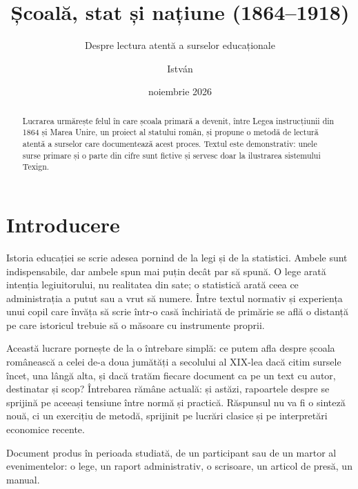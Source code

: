 \documentclass{texign-article}
\title{Școală, stat și națiune (1864–1918)}
\subtitle{Despre lectura atentă a surselor educaționale}
\author{István}
\date{noiembrie 2026}
\begin{document}
\maketitle

\begin{abstract}
Lucrarea urmărește felul în care școala primară a devenit, între Legea instrucțiunii din 1864 și Marea Unire, un proiect al statului român, și propune o metodă de lectură atentă a surselor care documentează acest proces. Textul este demonstrativ: unele surse primare și o parte din cifre sunt fictive și servesc doar la ilustrarea sistemului Texign.
\end{abstract}

\tableofcontents

\section{Introducere}\label{sec:intro}

Istoria educației se scrie adesea pornind de la legi și de la statistici. Ambele sunt indispensabile, dar ambele spun mai puțin decât par să spună. O lege arată intenția legiuitorului, nu realitatea din sate; o statistică arată ceea ce administrația a putut sau a vrut să numere. Între textul normativ și experiența unui copil care învăța să scrie într-o casă închiriată de primărie se află o distanță pe care istoricul trebuie să o măsoare cu instrumente proprii.

Această lucrare pornește de la o întrebare simplă: ce putem afla despre școala românească a celei de-a doua jumătăți a secolului al XIX-lea dacă citim sursele încet, una lângă alta, și dacă tratăm fiecare document ca pe un text cu autor, destinatar și scop? Întrebarea rămâne actuală: și astăzi, rapoartele  despre  se sprijină pe aceeași tensiune între normă și practică. Răspunsul nu va fi o sinteză nouă, ci un exercițiu de metodă, sprijinit pe lucrări clasice\cite[45-48]{iorga1928} și pe interpretări economice recente.\cite[112]{murgescu2010}

\begin{definition}
Document produs în perioada studiată, de un participant sau de un martor al evenimentelor: o lege, un raport administrativ, o scrisoare, un articol de presă, un manual.
\end{definition}
\end{document}
